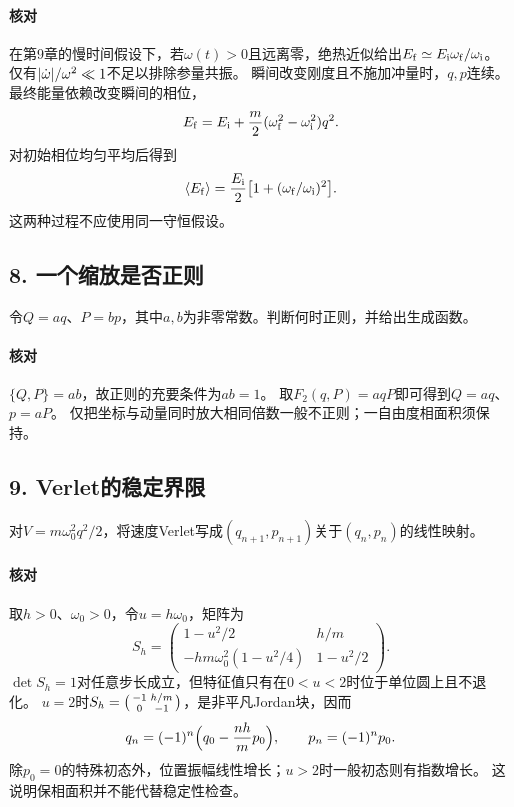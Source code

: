 \paragraph{核对}
在第9章的慢时间假设下，若$\omega(t) > 0$且远离零，绝热近似给出$E_\mathrm f \simeq E_\mathrm i\omega_\mathrm f/\omega_\mathrm i$。
仅有$\lvert\dot\omega\rvert/\omega^2 \ll 1$不足以排除参量共振。
瞬间改变刚度且不施加冲量时，$q,p$连续。最终能量依赖改变瞬间的相位，
\begin{equation}\label{eq:cm-sudden-frequency-energy}
 E_\mathrm f = E_\mathrm i + \frac{m}{2}(\omega_\mathrm f^2 - \omega_\mathrm i^2)q^2.
\end{equation}
对初始相位均匀平均后得到
\begin{equation}\label{eq:cm-sudden-frequency-phase-average}
 \langle E_\mathrm f\rangle = \frac{E_\mathrm i}{2}\bigl[1 + (\omega_\mathrm f/\omega_\mathrm i)^2\bigr].
\end{equation}
这两种过程不应使用同一守恒假设。

\subsection*{8. 一个缩放是否正则}
令$Q = aq$、$P = bp$，其中$a,b$为非零常数。判断何时正则，并给出生成函数。

\paragraph{核对}
$\{Q,P\} = ab$，故正则的充要条件为$ab = 1$。
取$F_2(q,P) = aqP$即可得到$Q = aq$、$p = aP$。
仅把坐标与动量同时放大相同倍数一般不正则；一自由度相面积须保持。

\subsection*{9. Verlet的稳定界限}
对$V = m\omega_0^2q^2/2$，将速度Verlet写成$(q_{n+1},p_{n+1})$关于$(q_n,p_n)$的线性映射。

\paragraph{核对}
取$h > 0$、$\omega_0 > 0$，令$u = h\omega_0$，矩阵为
\begin{equation}
 S_h = \begin{pmatrix}
 1 - u^2/2 & h/m\\
 -hm\omega_0^2(1 - u^2/4)&1 - u^2/2
 \end{pmatrix}.
\end{equation}
$\det S_h = 1$对任意步长成立，但特征值只有在$0 < u < 2$时位于单位圆上且不退化。
$u = 2$时$S_h = \bigl(\begin{smallmatrix}-1&h/m\\0&-1\end{smallmatrix}\bigr)$，是非平凡Jordan块，因而
\begin{equation}\label{eq:cm-verlet-stability-endpoint}
 q_n = (-1)^n\Bigl(q_0 - \frac{nh}{m}p_0\Bigr),\qquad p_n = (-1)^np_0.
\end{equation}
除$p_0 = 0$的特殊初态外，位置振幅线性增长；$u > 2$时一般初态则有指数增长。
这说明保相面积并不能代替稳定性检查。
